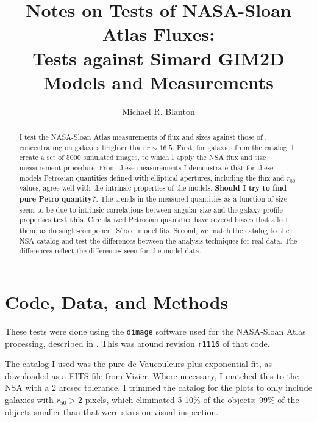 \documentclass[10pt,preprint]{aastex}
\newcommand{\Sersic}{S\'ersic}
\newcounter{thefigs}
\newcounter{address}
\begin{document}
\title{Notes on Tests of NASA-Sloan Atlas Fluxes:\\
Tests against Simard GIM2D Models and Measurements}


\author{
Michael R. Blanton\altaffilmark{\ref{NYU}}
}

\setcounter{address}{1}

\begin{abstract}
I test the NASA-Sloan Atlas measurements of flux and sizes against
those of \citet{simard11a}, concentrating on galaxies brighter than
$r\sim16.5$. First, for galaxies from the \citet{simard11a} catalog, I
create a set of 5000 simulated images, to which I apply the NSA flux
and size measurement procedure. From these measurements I demonstrate
that for these models Petrosian quantities defined with elliptical
apertures, including the flux and $r_{50}$ values, agree well with the
intrinsic properties of the models.  {\bf Should I try to find pure
Petro quantity?}.  The trends in the measured quantities as a function
of size seem to be due to intrinsic correlations between angular size
and the galaxy profile properties {\bf test this}. Circularized
Petrosian quantities have several biases that affect them, as do
single-component \Sersic\ model fits. Second, we match the
\citet{simard11a} catalog to the NSA catalog and test the differences
between the analysis techniques for real data. The differences reflect
the differences seen for the model data.
\end{abstract}

\setcounter{thefigs}{0}

\section{Code, Data, and Methods} 
\label{sec:code}

These tests were done using the {\tt dimage} software used for the
NASA-Sloan Atlas processing, described in \citet{blanton11a}. This was
around revision {\tt r1116} of that code. 

The \citet{simard11a} catalog I used was the pure de Vaucouleurs plus
exponential fit, as downloaded as a FITS file from Vizier. Where
necessary, I matched this to the NSA with a 2 arcsec tolerance. I
trimmed the \citet{simard11a} catalog for the plots to only include
galaxies with $r_{50}>2$ pixels, which eliminated 5-10\% of the
objects; 99\% of the objects smaller than that were stars on visual
inspection.
\end{document}
